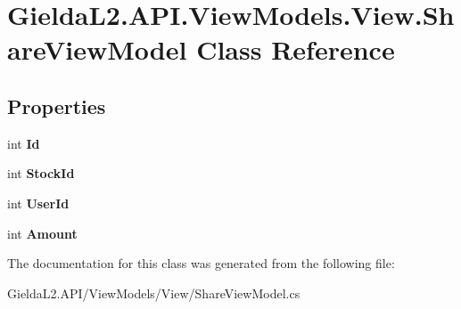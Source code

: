 \hypertarget{class_gielda_l2_1_1_a_p_i_1_1_view_models_1_1_view_1_1_share_view_model}{}\section{Gielda\+L2.\+A\+P\+I.\+View\+Models.\+View.\+Share\+View\+Model Class Reference}
\label{class_gielda_l2_1_1_a_p_i_1_1_view_models_1_1_view_1_1_share_view_model}
\subsection*{Properties}
\begin{DoxyCompactItemize}
\item 
\mbox{\label{class_gielda_l2_1_1_a_p_i_1_1_view_models_1_1_view_1_1_share_view_model_a14da94f66652d8a45de6296578b8ba58}} 
int {\bfseries Id}
\item 
\mbox{\label{class_gielda_l2_1_1_a_p_i_1_1_view_models_1_1_view_1_1_share_view_model_a7e65823dd428694276c107eec1c2c2d8}} 
int {\bfseries Stock\+Id}
\item 
\mbox{\label{class_gielda_l2_1_1_a_p_i_1_1_view_models_1_1_view_1_1_share_view_model_af45ec4f267937086bc843da65233ce50}} 
int {\bfseries User\+Id}
\item 
\mbox{\label{class_gielda_l2_1_1_a_p_i_1_1_view_models_1_1_view_1_1_share_view_model_a67b0b7b120d09a141e113b03f38fed78}} 
int {\bfseries Amount}
\end{DoxyCompactItemize}


The documentation for this class was generated from the following file\+:\begin{DoxyCompactItemize}
\item 
Gielda\+L2.\+A\+P\+I/\+View\+Models/\+View/Share\+View\+Model.\+cs\end{DoxyCompactItemize}
